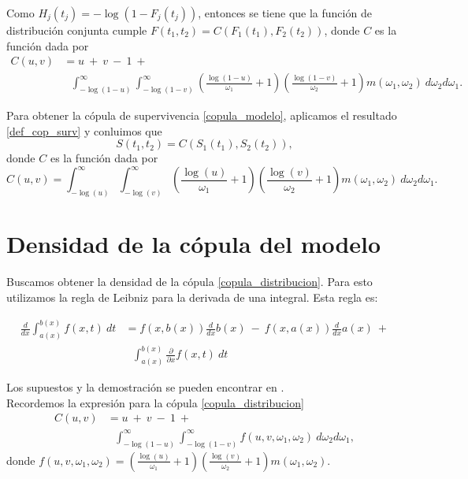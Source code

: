 \documentclass[11pt,a4paper]{article}
\begin{document}
\begin{appendices}
Como $H_j(t_j) = -\log (1-F_j(t_j))$, entonces se tiene que la función de distribución conjunta cumple $F(t_1, t_2) = C(F_1(t_1), F_2(t_2))$, donde $C$ es la función dada por
\begin{align} \label{eq:copula:original}
C(u, v) &= u \ + \ v \ - \ 1 \ + \nonumber \\
& \ \ \ \int_{-\log (1-u)}^\infty \int_{-\log (1-v)}^\infty \left( \frac{\log (1-u)}{\omega_1}+1 \right) \left( \frac{\log (1-v)}{\omega_2}+1\right) m(\omega_1, \omega_2) \ d\omega_2 d\omega_1.
\end{align}

Para obtener la cópula de supervivencia \eqref{copula_modelo}, aplicamos el resultado \ref{def_cop_surv} y conluimos que $$S(t_1, t_2) = C(S_1(t_1), S_2(t_2)),$$ donde $C$ es la función dada por $$C(u, v) = \int_{-\log (u)}^\infty \int_{-\log (v)}^\infty \left( \frac{\log (u)}{\omega_1}+1 \right) \left( \frac{\log (v)}{\omega_2}+1\right) m(\omega_1, \omega_2) \ d\omega_2 d\omega_1.$$

\newpage

\section{Densidad de la cópula del modelo}
\label{sec_densidad_copula_modelo}

Buscamos obtener la densidad de la cópula \eqref{copula_distribucion}. Para esto utilizamos la regla de Leibniz para la derivada de una integral. Esta regla es:

\begin{align}\label{regla_leibniz}
\frac{d}{dx} \int_{a(x)}^{b(x)} f(x, t) \ dt &= f(x, b(x)) \frac{d}{dx}b(x) \ - \ f(x, a(x))\frac{d}{dx}a(x) \ + \nonumber\\
&\ \ \ \int_{a(x)}^{b(x)}\frac{\partial}{\partial x} f(x, t) \ dt
\end{align}

Los supuestos y la demostración se pueden encontrar en \citet{flanders}.\\

Recordemos la expresión para la cópula \eqref{copula_distribucion}
\begin{align*}
C(u, v) &= u \ + \ v \ - \ 1 \ +\\ 
& \ \ \ \int_{-\log (1-u)}^\infty \int_{-\log (1-v)}^\infty f(u, v, \omega_1, \omega_2) \ d\omega_2 d\omega_1,
\end{align*}
donde $f(u, v, \omega_1, \omega_2) = \left( \frac{\log (u)}{\omega_1}+1 \right) \left( \frac{\log (v)}{\omega_2}+1\right) m(\omega_1, \omega_2)$.\\


\end{appendices}
\end{document}
